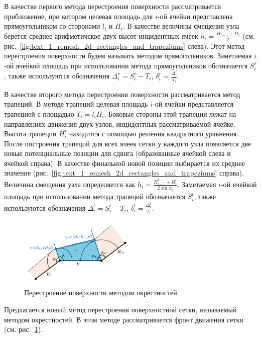 \documentclass[a4paper,14pt]{extarticle}                     %
\theoremstyle{plain}                                         %
\begin{document}
В качестве первого метода перестроения поверхности рассматривается приближение, при котором целевая площадь для $i$-ой ячейки представлена прямоугольником со сторонами $l_i$ и $H_i$.
В качестве величины смещения узла берется среднее арифметичское двух высот инцидентных ячеек $h_i = \frac{H_{i - 1} + H_i}{2}$ (см. рис.~\ref{fig:text_1_remesh_2d_rectangles_and_trapeziums} слева).
Этот метод перестроения поверхности будем называть методом прямогольников\label{term:method_remesh_rect}.
Заметаемая $i$-ой ячейкой площадь при использовании метода прямоугольников обозначается $S_i^r$, также используются обозначения $\Delta_i^r = S_i^r - T_i$, $\delta_i^r = \frac{\Delta_i^r}{T_i}$.

В качестве второго метода перестроения поверхности рассматривается метод трапеций\label{term:method_remesh_trap}.
В методе трапеций целевая площадь $i$-ой ячейки представляется трапецией с площадью $T_i = l_i H_i$.
Боковые стороны этой трапеции лежат на направлениях движения двух узлов, инцидентных рассматриваемой ячейке.
Высота трапеции $H_i^t$ находится с помощью решения квадратного уравнения.
После построения трапеций для всех ячеек сетки у каждого узла появляется две новые потенциальные позиции для сдвига (образованные ячейкой слева и ячейкой справа).
В качестве финальной новой позиции выбирается их среднее значение (рис.~\ref{fig:text_1_remesh_2d_rectangles_and_trapeziums} справа).
Величина смещения узла определяется как $h_i = \frac{H_{i - 1}^t + H_i^t}{2 \sin \phi_i}$.
Заметаемая $i$-ой ячейкой площадь при использовании метода трапеций обозначается $S_i^t$, также используются обозначения $\Delta_i^t = S_i^t - T_i$, $\delta_i^t = \frac{\Delta_i^t}{T_i}$.

\begin{figure}[ht]
\centering
\includegraphics[width=0.5\textwidth]{pics/text_1_remesh_2d/remesh_okrestnost.pdf}
\singlespacing
{}\caption{Перестроение поверхности методом окрестностей.}
\label{fig:text_1_remesh_2d_okrestnost}
\end{figure}

Предлагается новый метод перестроения поверхностной сетки, называемый методом окрестностей\label{term:method_remesh_okr3}.
В этом методе рассматривается фронт движения сетки (см. рис.~\ref{fig:text_1_remesh_2d_okrestnost}).
\end{document}
